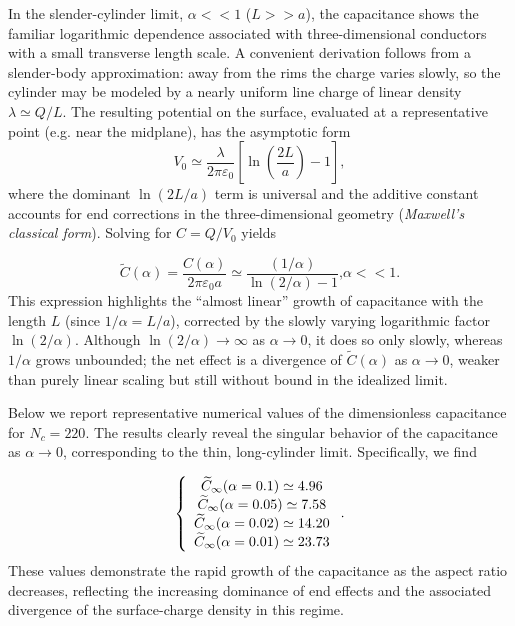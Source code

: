 \documentclass[12pt]{article}
\begin{document}
In the slender-cylinder limit, $\alpha<<1$ ($L>>a$), the capacitance shows the
familiar logarithmic dependence associated with three-dimensional conductors
with a small transverse length scale. A convenient derivation follows from a
slender-body approximation: away from the rims the charge varies slowly, so
the cylinder may be modeled by a nearly uniform line charge of linear density
$\lambda\simeq Q/L$. The resulting potential on the surface, evaluated at a
representative point (e.g. near the midplane), has the asymptotic form%
\begin{equation}
V_{0}\simeq\frac{\lambda}{2\pi\varepsilon_{0}}\left[  \ln\left(  \frac{2L}%
{a}\right)  -1\right]  , \label{c12a}%
\end{equation}
where the dominant $\ln(2L/a)$ term is universal and the additive constant
accounts for end corrections in the three-dimensional geometry
(\textit{Maxwell's classical form})\cite{maxwell}. Solving for $C=Q/V_{0}$ yields%

\begin{equation}
\widetilde{C}(\alpha)=\frac{C(\alpha)}{2\pi\varepsilon_{0}a}\simeq
\frac{\left(  1/\alpha\right)  }{\ln\left(  2/\alpha\right)  -1}\text{,
}\alpha<<1. \label{c14}%
\end{equation}
This expression highlights the ``almost linear'' growth of capacitance with
the length $L$ (since $1/\alpha=L/a$), corrected by the slowly varying
logarithmic factor $\ln\left(  2/\alpha\right)  $. Although $\ln\left(
2/\alpha\right)  \rightarrow\infty$ as $\alpha\rightarrow0$, it does so only
slowly, whereas $1/\alpha$ grows unbounded; the net effect is a divergence of
$\widetilde{C}(\alpha)$ as $\alpha\rightarrow0$, weaker than purely linear
scaling but still without bound in the idealized limit.

Below we report representative numerical values of the dimensionless
capacitance for $N_{c}=220$. The results clearly reveal the singular behavior
of the capacitance as $\alpha\rightarrow0$, corresponding to the thin,
long-cylinder limit. Specifically, we find%

\begin{equation}
\left\{
\begin{array}
[c]{c}%
\widetilde{C}_{\infty}(\alpha=0.1)\simeq4.96\\
\widetilde{C}_{\infty}(\alpha=0.05)\simeq7.58\\
\widetilde{C}_{\infty}(\alpha=0.02)\simeq14.20\\
\widetilde{C}_{\infty}(\alpha=0.01)\simeq23.73
\end{array}
\right.  . \label{c13b}%
\end{equation}
These values demonstrate the rapid growth of the capacitance as the aspect
ratio decreases, reflecting the increasing dominance of end effects and the
associated divergence of the surface-charge density in this regime.
\end{document}
